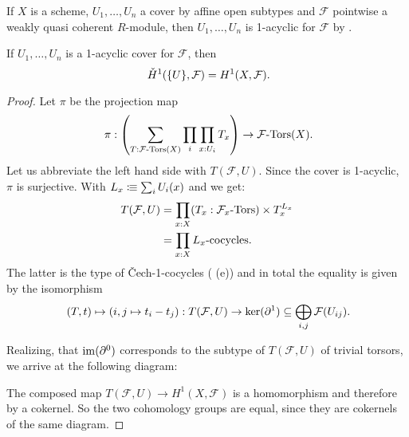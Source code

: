 \begin{example}
  If $X$ is a scheme, $U_1,\dots,U_n$ a cover by affine open subtypes
  and $\mathcal F$ pointwise a weakly quasi coherent $R$-module,
  then $U_1,\dots,U_n$ is 1-acyclic for $\mathcal F$ by .
\end{example}

\begin{theorem}%
  If $U_1,\dots,U_n$ is a 1-acyclic cover for $\mathcal F$, then
  \[
    \check{H}^1(\{U\},\mathcal F)=H^1(X,\mathcal F)\rlap{.}
  \]
\end{theorem}

\begin{proof}
  Let $\pi$ be the projection map
  \[
    \pi :
    \left(
      \sum_{T:\Tors{\mathcal F}(X)}\prod_{i}\prod_{x:U_i}T_x
    \right)
    \to \Tors{\mathcal F}(X)\rlap{.}
  \]
  Let us abbreviate the left hand side with $T(\mathcal F,U)$.
  Since the cover is 1-acyclic, $\pi$ is surjective.
  With $L_x\vcentcolon\mspace{-1.2mu}\equiv \sum_{i}U_i(x)$ and  we get:
  \begin{align*}
    T(\mathcal F,U)&=\prod_{x:X}(T_x:\Tors{\mathcal F_x})\times T_x^{L_x} \\
                   &=\prod_{x:X}\text{$L_x$-cocycles}
                     \rlap{.}
  \end{align*}
  The latter is the type of \v{C}ech-1-cocycles ( (e))
  and in total the equality is given by the isomorphism
  \[
    (T,t) \mapsto (i,j\mapsto t_i - t_j) :
    T(\mathcal F,U)
    \to
    \ker(\partial^1)
    \subseteq
    \bigoplus_{i,j}\mathcal F(U_{ij})\rlap{.}
  \]

  Realizing, that $\operatorname{im}(\partial^0)$ corresponds to the subtype of $T(\mathcal F,U)$ of trivial torsors,
  we arrive at the following diagram:
  \begin{center}
  \end{center}
  The composed map $T(\mathcal F,U)\to H^1(X,\mathcal F)$ is a homomorphism
  and therefore by  a cokernel.
  So the two cohomology groups are equal, since they are cokernels of the same diagram.
\end{proof}


